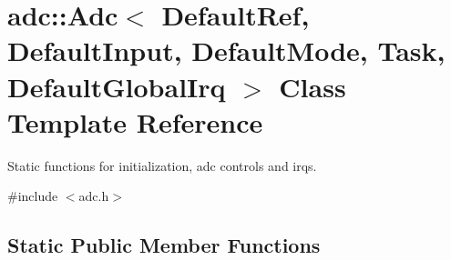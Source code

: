 \hypertarget{classadc_1_1Adc}{}\section{adc\+:\+:Adc$<$ Default\+Ref, Default\+Input, Default\+Mode, Task, Default\+Global\+Irq $>$ Class Template Reference}
\label{classadc_1_1Adc}


Static functions for initialization, adc controls and irqs.  




{\ttfamily \#include $<$adc.\+h$>$}

\subsection*{Static Public Member Functions}
